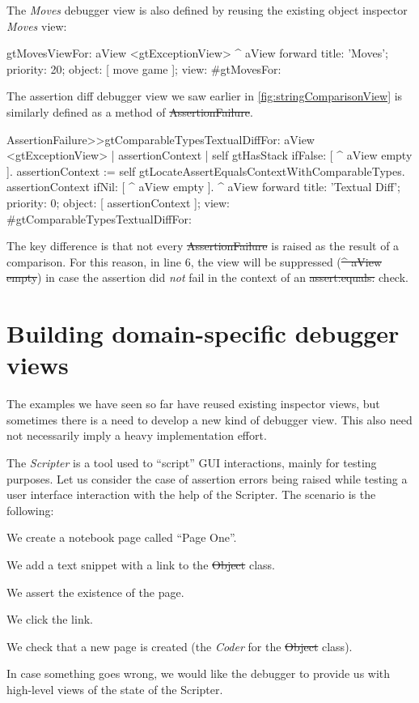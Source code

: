 \documentclass[sigplan,anonymous,review,10pt]{acmart}
\newcommand{\GT}{\lst{GT}\xspace} %
\begin{document}
The \emph{Moves} debugger view is also defined by reusing the existing object inspector \emph{Moves} view:
\begin{code}
gtMovesViewFor: aView
	<gtExceptionView>
	^ aView forward
		title: 'Moves';
		priority: 20;
		object: [ move game ];
		view: #gtMovesFor:
\end{code}

The assertion diff debugger view we saw earlier in \autoref{fig:stringComparisonView} is similarly defined as a method of \st{AssertionFailure}.
\begin{code}
AssertionFailure>>gtComparableTypesTextualDiffFor: aView
	<gtExceptionView>
	| assertionContext |
	self gtHasStack ifFalse: [ ^ aView empty ].
	assertionContext := self gtLocateAssertEqualsContextWithComparableTypes.
	assertionContext ifNil: [ ^ aView empty ].
	^ aView forward
		title: 'Textual Diff';
		priority: 0;
		object: [ assertionContext ];
		view: #gtComparableTypesTextualDiffFor:
\end{code}
The key difference is that not every \st{AssertionFailure} is raised as the result of a comparison.
For this reason, in line $6$, the view will be suppressed (\st{^ aView empty}) in case the assertion did \emph{not} fail in the context of an \st{assert:equals:} check.

\section{Building domain-specific debugger views}\label{sec:interactions}

The examples we have seen so far have reused existing inspector views, but sometimes there is a need to develop a new kind of debugger view.
This also need not necessarily imply a heavy implementation effort.

The \GT \emph{Scripter} is a tool used to ``script'' GUI interactions, mainly for testing purposes.
Let us consider the case of assertion errors being raised while testing a user interface interaction with the help of the Scripter.
The scenario is the following:
\begin{inparaenum}[(i)]
	\item We create a notebook page called ``Page One''.
	\item We add a text snippet with a link to the \st{Object} class.
	\item We assert the existence of the page.
	\item We click the link.
	\item We check that a new page is created (\ie the \emph{Coder} for the \st{Object} class).
\end{inparaenum}
In case something goes wrong, we would like the debugger to provide us with high-level views of the state of the Scripter.
\end{document}
